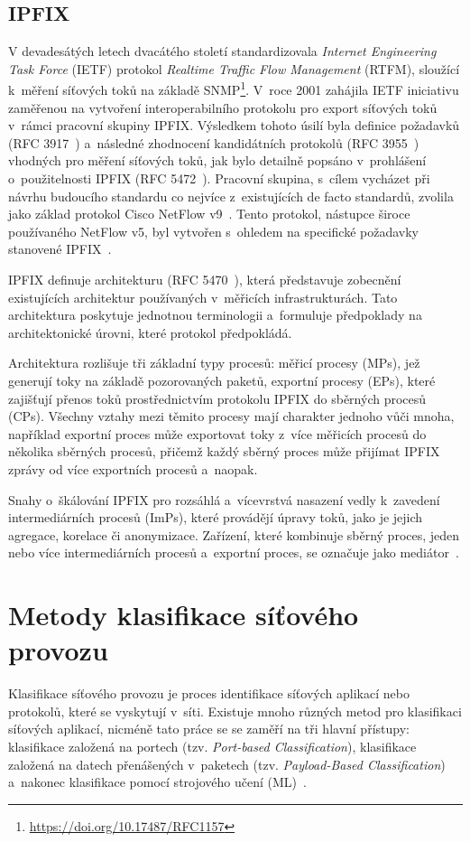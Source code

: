 \subsection{IPFIX}
V devadesátých letech dvacátého století standardizovala \textit{Internet Engineering Task Force} (IETF) protokol \textit{Realtime Traffic Flow Management} (RTFM), sloužící k~měření síťových toků na základě SNMP\footnote{\url{https://doi.org/10.17487/RFC1157}}. V~roce 2001 zahájila IETF iniciativu zaměřenou na vytvoření interoperabilního protokolu pro export síťových toků v~rámci pracovní skupiny IPFIX. Výsledkem tohoto úsilí byla definice požadavků (RFC 3917~\cite{rfc3917}) a~následné zhodnocení kandidátních protokolů (RFC 3955~\cite{rfc3955}) vhodných pro měření síťových toků, jak bylo detailně popsáno v~prohlášení o~použitelnosti IPFIX (RFC 5472~\cite{rfc5472}). Pracovní skupina, s~cílem vycházet při návrhu budoucího standardu co nejvíce z~existujících de facto standardů, zvolila jako základ protokol Cisco NetFlow v9~\cite{rfc3954}. Tento protokol, nástupce široce používaného NetFlow v5, byl vytvořen s~ohledem na specifické požadavky stanovené IPFIX~\cite{IPFIX}.

IPFIX definuje architekturu (RFC 5470~\cite{rfc5470}), která představuje zobecnění existujících architektur používaných v~měřicích infrastrukturách. Tato architektura poskytuje jednotnou terminologii a~formuluje předpoklady na architektonické úrovni, které protokol předpokládá.

Architektura rozlišuje tři základní typy procesů: měřicí procesy (MPs), jež generují toky na základě pozorovaných paketů, exportní procesy (EPs), které zajišťují přenos toků prostřednictvím protokolu IPFIX do sběrných procesů (CPs). Všechny vztahy mezi těmito procesy mají charakter jednoho vůči mnoha, například exportní proces může exportovat toky z~více měřicích procesů do několika sběrných procesů, přičemž každý sběrný proces může přijímat IPFIX zprávy od více exportních procesů a~naopak.

Snahy o~škálování IPFIX pro rozsáhlá a~vícevrstvá nasazení vedly k~zavedení intermediárních procesů (ImPs), které provádějí úpravy toků, jako je jejich agregace, korelace či anonymizace. Zařízení, které kombinuje sběrný proces, jeden nebo více intermediárních procesů a~exportní proces, se označuje jako mediátor~\cite{IPFIX}.

\section{Metody klasifikace síťového provozu}
Klasifikace síťového provozu je proces identifikace síťových aplikací nebo protokolů, které se vyskytují v~síti. Existuje mnoho různých metod pro klasifikaci síťových aplikací, nicméně tato práce se se zaměří na tři hlavní přístupy:  klasifikace založená na portech (tzv. \textit{Port-based Classification}), klasifikace založená na datech přenášených v~paketech (tzv. \textit{Payload-Based Classification}) a~nakonec klasifikace pomocí strojového učení (ML)~\cite{network_classification}.

